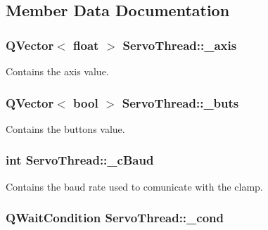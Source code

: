 \subsection{Member Data Documentation}
\hypertarget{a00008_aad24ef961ee39dd35766c725c13b11b7}{}
\subsubsection[{\+\_\+axis}]{\setlength{\rightskip}{0pt plus 5cm}Q\+Vector$<$ float $>$ Servo\+Thread\+::\+\_\+axis\hspace{0.3cm}{\ttfamily [private]}}\label{a00008_aad24ef961ee39dd35766c725c13b11b7}


Contains the axis value. 

\hypertarget{a00008_a6f956f7e0f2953e213ff95fb64857ab0}{}
\subsubsection[{\+\_\+buts}]{\setlength{\rightskip}{0pt plus 5cm}Q\+Vector$<$ bool $>$ Servo\+Thread\+::\+\_\+buts\hspace{0.3cm}{\ttfamily [private]}}\label{a00008_a6f956f7e0f2953e213ff95fb64857ab0}


Contains the buttons value. 

\hypertarget{a00008_a9fccfd415e2e55c8abef7fcc6535af30}{}
\subsubsection[{\+\_\+c\+Baud}]{\setlength{\rightskip}{0pt plus 5cm}int Servo\+Thread\+::\+\_\+c\+Baud\hspace{0.3cm}{\ttfamily [private]}}\label{a00008_a9fccfd415e2e55c8abef7fcc6535af30}


Contains the baud rate used to comunicate with the clamp. 

\hypertarget{a00008_afcb93c09acd7fecf47d92996a297365c}{}
\subsubsection[{\+\_\+cond}]{\setlength{\rightskip}{0pt plus 5cm}Q\+Wait\+Condition Servo\+Thread\+::\+\_\+cond\hspace{0.3cm}{\ttfamily [private]}}\label{a00008_afcb93c09acd7fecf47d92996a297365c}



